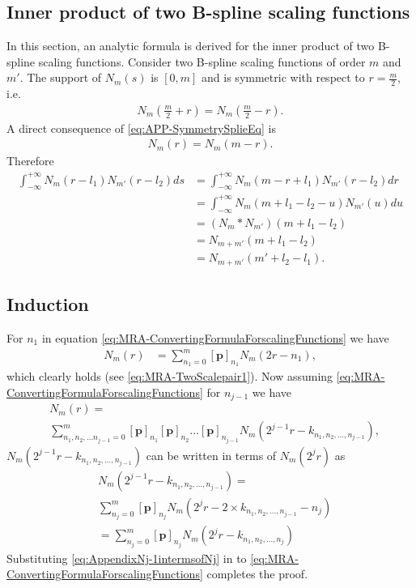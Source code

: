 \documentclass[11pt,draftcls,onecolumn,peerreview]{IEEEtran}
\begin{document}
\subsection{Inner product of two B-spline scaling functions}\label{ap:InnerProductOfBsplines}
In this section, an analytic formula is derived for the inner product of two B-spline scaling functions. Consider two B-spline scaling functions of order $m$ and $m'$. The support of $N_m\left(s\right)$ is $\left[ 0,m\right]$ and  is symmetric with respect to $r=\frac{m}{2}$, i.e.
\begin{align}\label{eq:APP-SymmetrySplieEq}
 N_{m}\left(\frac{m}{2}+r\right)=N_{m}\left(\frac{m}{2}-r\right).
\end{align}
A direct consequence of \eqref{eq:APP-SymmetrySplieEq} is 
\begin{align}
 N_{m}\left(r\right)=N_{m}\left(m-r\right).
\end{align}
Therefore
\begin{align}
\int_{-\infty}^{+\infty}N_{m}\left(r-l_{1}\right)N_{m'}\left(r-l_{2}\right)ds&=\int_{-\infty}^{+\infty}N_{m}\left(m-r+l_{1}\right)N_{m'}\left(r-l_{2}\right)dr \nonumber \\
&=\int_{-\infty}^{+\infty}N_{m}\left(m+l_{1}-l_{2}-u\right)N_{m'}\left(u\right)du \nonumber \\
&=\left(N_m \ast N_{m'}\right) \left(m+l_{1}-l_{2}\right) \nonumber \\
&=N_{m+m'}\left(m+l_{1}-l_{2}\right) \nonumber \\
&=N_{m+m'}\left(m'+l_{2}-l_{1}\right).
\end{align}
\subsection{Induction}\label{ap:Induction}
For $n_1$ in equation \eqref{eq:MRA-ConvertingFormulaForscalingFunctions} we have
\begin{align}
 N_{m}\left(r\right)&=\sum_{n_1=0}^{m} \left[\mathbf p\right]_{n_1} N_{m}\left(2r-n_1\right) \label{eq:App-TwoScalepair1},
  \end{align}
which clearly holds (see \eqref{eq:MRA-TwoScalepair1}). Now assuming \eqref{eq:MRA-ConvertingFormulaForscalingFunctions} for $n_{j-1}$ we have
\begin{align}\label{eq:app-ConvertingFormulaForscalingFunctions}
 &N_m(r)=\nonumber \\
&\sum_{n_1,n_2, \dots n_{j-1}=0}^{m}\left[\mathbf p\right]_{n_1} \left[\mathbf p\right]_{n_2}\dots \left[\mathbf p\right]_{n_{j-1}}N_m(2^{j-1}r-k_{n_1,n_2, \dots, n_{j-1}}),
\end{align}
$N_m(2^{j-1}r-k_{n_1,n_2, \dots, n_{j-1}})$ can be written in terms of $N_m(2^{j}r)$ as
\begin{align}\label{eq:AppendixNj-1intermsofNj}
 &N_m(2^{j-1}r-k_{n_1,n_2, \dots, n_{j-1}})=\nonumber \\
&\sum_{n_j=0}^m \left[\mathbf p\right]_{n_j}N_m(2^jr-2\times k_{n_1,n_2, \dots, n_{j-1}}-n_j)\nonumber \\
&=\sum_{n_j=0}^m \left[\mathbf p\right]_{n_j}N_m(2^jr- k_{n_1,n_2, \dots, n_{j}})
\end{align}
Substituting \eqref{eq:AppendixNj-1intermsofNj} in to \eqref{eq:MRA-ConvertingFormulaForscalingFunctions} completes the proof. 
\end{document}
